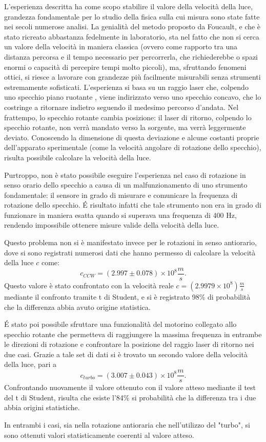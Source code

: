 L'esperienza descritta ha come scopo stabilire il valore della velocità della luce, grandezza fondamentale per lo studio della fisica sulla cui misura sono state fatte nei secoli numerose analisi. La genialità del metodo proposto da Foucault, e che è stato ricreato abbastanza fedelmente in laboratorio, sta nel fatto che non si cerca un valore della velocità in maniera classica (ovvero come rapporto tra una distanza percorsa e il tempo necessario per percorrerla, che richiederebbe o spazi enormi o capacità di percepire tempi molto piccoli), ma, sfruttando fenomeni ottici, si riesce a lavorare con grandezze più facilmente misurabili senza strumenti estremamente sofisticati.
L'esperienza si basa su un raggio laser che, colpendo uno specchio piano ruotante , viene indirizzato verso uno specchio concavo, che lo costringe a ritornare indietro seguendo il medesimo percorso d'andata. Nel frattempo, lo specchio rotante cambia posizione: il laser di ritorno, colpendo lo specchio rotante, non verrà mandato verso la sorgente, ma verrà leggermente deviato. Conoscendo la dimensione di questa deviazione e alcune costanti proprie dell'apparato sperimentale (come la velocità angolare di rotazione dello specchio), risulta possibile calcolare la velocità della luce.

Purtroppo, non è stato possibile eseguire l'esperienza nel caso di rotazione in senso orario dello specchio a causa di un malfunzionamento di uno strumento fondamentale: il sensore in grado di misurare e comunicare la frequenza di rotazione dello specchio. \'E risultato infatti che tale strumento non era in grado di funzionare in maniera esatta quando si superava una frequenza di 400 Hz, rendendo impossibile ottenere misure valide della velocità della luce.

Questo problema non si è manifestato invece per le rotazioni in senso antiorario, dove si sono registrati numerosi dati che hanno permesso di calcolare la velocità della luce $c$ come:
\begin{equation}
    c_{CCW}=(2.997\pm0.078)\times 10^8\frac{m}{s}.
\end{equation}
Questo valore è stato confrontato con la velocità reale $c=(2.9979\times 10^8)\frac{m}{s}$ mediante il confronto tramite t di Student, e si è registrato 98\% di probabilità che la differenza abbia avuto origine statistica.

\'E stato poi possibile sfruttare una funzionalità del motorino collegato allo specchio rotante che permetteva di raggiungere la massima frequenza in entrambe le direzioni di rotazione e confrontare la posizione del raggio laser di ritorno nei due casi. Grazie a tale set di dati si è trovato un secondo valore della velocità della luce, pari a 
\begin{equation}
    c_{turbo}=(3.007\pm0.043)\times 10^8 \frac{m}{s}.
\end{equation}
Confrontando nuovamente il valore ottenuto con il valore atteso mediante il test del t di Student, risulta che esiste l'84\% si probabilità che la differenza tra i due abbia origini statistiche.

In entrambi i casi, sia nella rotazione antioraria che nell'utilizzo del "turbo", si sono ottenuti valori statisticamente coerenti al valore atteso.


